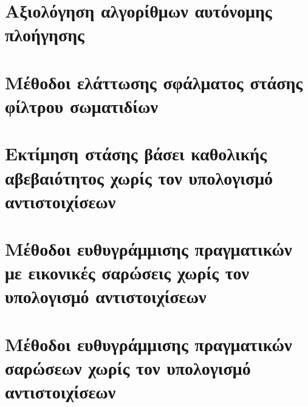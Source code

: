 \chapter{Αξιολόγηση αλγορίθμων αυτόνομης πλοήγησης}
  \label{appendix:01}
  

\chapter{Μέθοδοι ελάττωσης σφάλματος στάσης φίλτρου σωματιδίων}
  \label{appendix:02}
  

\chapter{Εκτίμηση στάσης βάσει καθολικής αβεβαιότητος χωρίς τον υπολογισμό αντιστοιχίσεων}
  \label{appendix:03}
  

\chapter{Μέθοδοι ευθυγράμμισης πραγματικών με εικονικές σαρώσεις χωρίς τον υπολογισμό αντιστοιχίσεων}
  \label{appendix:04}
  

\chapter{Μέθοδοι ευθυγράμμισης πραγματικών σαρώσεων χωρίς τον υπολογισμό αντιστοιχίσεων}
  \label{appendix:05}
  
